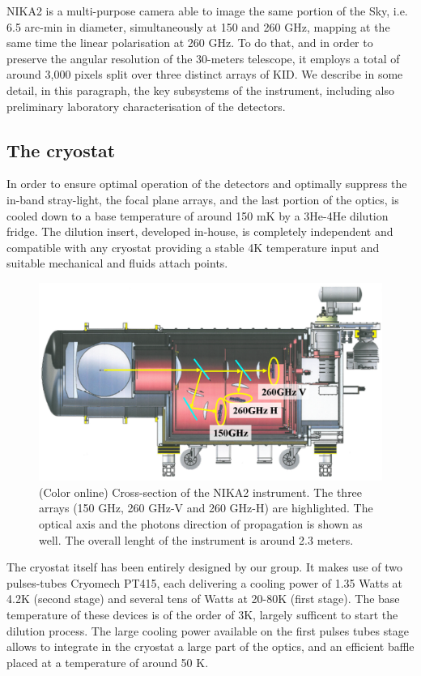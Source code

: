 \documentclass[]{aa} %
\begin{document}
NIKA2 is a multi-purpose camera able to image the same portion of the Sky, i.e. 6.5 arc-min in diameter, simultaneously at 150 and 260 GHz, mapping at the same time the linear polarisation  at 260 GHz. To do that, and in order to preserve the angular resolution of the 30-meters telescope, it employs a total of around 3,000 pixels split over three distinct arrays of KID. We describe in some detail, in this paragraph, the key subsystems of the instrument, including also preliminary laboratory characterisation of the detectors. 


 \subsection{The cryostat}

In order to ensure optimal operation of the detectors and optimally suppress the in-band stray-light, the focal plane arrays, and the last portion of the optics, is cooled down to a base temperature of around 150 mK by a 3He-4He dilution fridge. The dilution insert, developed in-house, is completely independent and compatible with any cryostat providing a stable 4K temperature input and suitable mechanical and fluids attach points. 

\begin{figure}[h]
   \centering
   \includegraphics[width=.95\linewidth]{Fig1_cryo.png}
      \caption{(Color online) Cross-section of the NIKA2 instrument. The three arrays (150 GHz, 260 GHz-V and 260 GHz-H) are highlighted. The optical axis and the photons direction of propagation is shown as well. The overall lenght of the instrument is around 2.3 meters.}
         \label{Cryostat}
\end{figure}

The cryostat itself has been entirely designed by our group. It makes use of two pulses-tubes Cryomech PT415, each delivering a cooling power of 1.35 Watts at 4.2K (second stage) and several tens of Watts at 20-80K (first stage). The base temperature of these devices is of the order of 3K, largely sufficent to start the dilution process. The large cooling power available on the first pulses tubes stage allows to integrate in the cryostat a large part of the optics, and an efficient baffle placed at a temperature of around 50 K.
\end{document}
